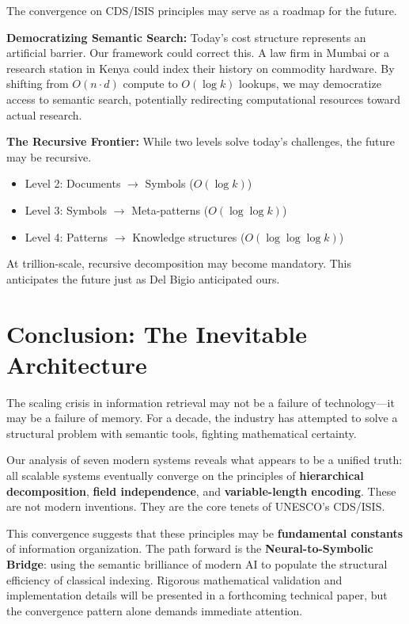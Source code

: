 \documentclass[manuscript,screen,nonacm]{acmart}
\begin{document}
The convergence on CDS/ISIS principles may serve as a roadmap for the future.

\textbf{Democratizing Semantic Search:}
Today's cost structure represents an artificial barrier. Our framework could correct this. A law firm in Mumbai or a research station in Kenya could index their history on commodity hardware. By shifting from $O(n \cdot d)$ compute to $O(\log k)$ lookups, we may democratize access to semantic search, potentially redirecting computational resources toward actual research.

\textbf{The Recursive Frontier:}
While two levels solve today's challenges, the future may be recursive.
\begin{itemize}
    \item Level 2: Documents $\rightarrow$ Symbols ($O(\log k)$)
    \item Level 3: Symbols $\rightarrow$ Meta-patterns ($O(\log \log k)$)
    \item Level 4: Patterns $\rightarrow$ Knowledge structures ($O(\log \log \log k)$)
\end{itemize}
At trillion-scale, recursive decomposition may become mandatory. This anticipates the future just as Del Bigio anticipated ours.

\section{Conclusion: The Inevitable Architecture}

The scaling crisis in information retrieval may not be a failure of technology---it may be a failure of memory. For a decade, the industry has attempted to solve a structural problem with semantic tools, fighting mathematical certainty.

Our analysis of seven modern systems reveals what appears to be a unified truth: all scalable systems eventually converge on the principles of \textbf{hierarchical decomposition}, \textbf{field independence}, and \textbf{variable-length encoding}. These are not modern inventions. They are the core tenets of UNESCO's CDS/ISIS.

This convergence suggests that these principles may be \textbf{fundamental constants} of information organization. The path forward is the \textbf{Neural-to-Symbolic Bridge}: using the semantic brilliance of modern AI to populate the structural efficiency of classical indexing. Rigorous mathematical validation and implementation details will be presented in a forthcoming technical paper, but the convergence pattern alone demands immediate attention.
\end{document}

